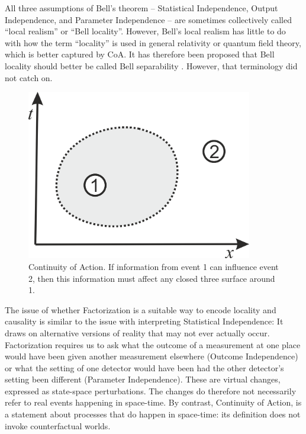\documentclass[12pt]{article}
\begin{document}
All three assumptions of Bell's theorem -- Statistical Independence, Output Independence, and Parameter Independence -- are sometimes collectively called ``local realism'' or ``Bell locality''. However, Bell's local realism has little to do with how the term ``locality'' is used in general relativity or quantum field theory, which is better captured by CoA.  It has therefore been proposed that Bell locality should better be called Bell separability \cite{Hall}. However, that terminology did not catch on. 




\begin{figure}
  \begin{center}
    \includegraphics[width=0.88\textwidth]{coa.png}
  \end{center}
  \caption{Continuity of Action. If information from event 1 can influence event 2, then this information must affect any closed three surface around 1. \label{fig2} }

\end{figure}



The issue of whether Factorization is a suitable way to encode locality and causality is similar to the issue with interpreting Statistical Independence: It draws on alternative versions of reality that may not ever actually occur. Factorization requires us to ask what the outcome of a measurement at one place would have been given another measurement elsewhere (Outcome Independence) or what the setting of one detector would have been had the other detector's setting been different (Parameter Independence). These are virtual changes, expressed as state-space perturbations. The changes do therefore not necessarily refer to real events happening in space-time. By contrast, Continuity of Action, is a statement about processes that do happen in space-time: its definition does not invoke counterfactual worlds. 
\end{document}
